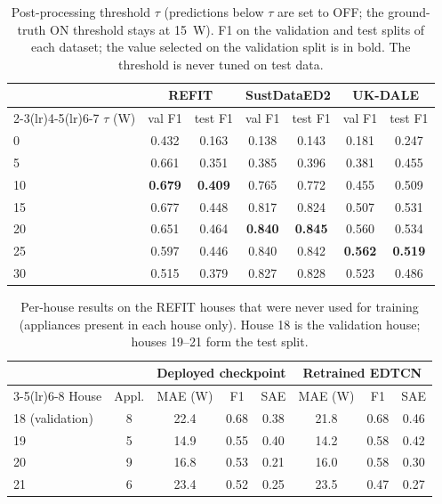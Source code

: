 \begin{table}[H]
\centering
\caption{Post-processing threshold $\tau$ (predictions below $\tau$ are set to OFF; the ground-truth ON threshold stays at 15~W). F1 on the validation and test splits of each dataset; the value selected on the validation split is in bold. The threshold is never tuned on test data.}
\label{tab:threshold_sweep}
\footnotesize
\begin{tabular}{@{}lcccccc@{}}
\toprule
 & \multicolumn{2}{c}{REFIT} & \multicolumn{2}{c}{SustDataED2} & \multicolumn{2}{c}{UK-DALE} \\
\cmidrule(lr){2-3}\cmidrule(lr){4-5}\cmidrule(lr){6-7}
$\tau$ (W) & val F1 & test F1 & val F1 & test F1 & val F1 & test F1 \\
\midrule
0 & 0.432 & 0.163 & 0.138 & 0.143 & 0.181 & 0.247 \\
5 & 0.661 & 0.351 & 0.385 & 0.396 & 0.381 & 0.455 \\
10 & \textbf{0.679} & \textbf{0.409} & 0.765 & 0.772 & 0.455 & 0.509 \\
15 & 0.677 & 0.448 & 0.817 & 0.824 & 0.507 & 0.531 \\
20 & 0.651 & 0.464 & \textbf{0.840} & \textbf{0.845} & 0.560 & 0.534 \\
25 & 0.597 & 0.446 & 0.840 & 0.842 & \textbf{0.562} & \textbf{0.519} \\
30 & 0.515 & 0.379 & 0.827 & 0.828 & 0.523 & 0.486 \\
\bottomrule
\end{tabular}
\end{table}

\begin{table}[H]
\centering
\caption{Per-house results on the REFIT houses that were never used for training (appliances present in each house only). House 18 is the validation house; houses 19--21 form the test split.}
\label{tab:unseen_houses}
\footnotesize
\begin{tabular}{@{}lccccccc@{}}
\toprule
 & & \multicolumn{3}{c}{Deployed checkpoint} & \multicolumn{3}{c}{Retrained EDTCN} \\
\cmidrule(lr){3-5}\cmidrule(lr){6-8}
House & Appl. & MAE (W) & F1 & SAE & MAE (W) & F1 & SAE \\
\midrule
18 (validation) & 8 & 22.4 & 0.68 & 0.38 & 21.8 & 0.68 & 0.46 \\
19 & 5 & 14.9 & 0.55 & 0.40 & 14.2 & 0.58 & 0.42 \\
20 & 9 & 16.8 & 0.53 & 0.21 & 16.0 & 0.58 & 0.30 \\
21 & 6 & 23.4 & 0.52 & 0.25 & 23.5 & 0.47 & 0.27 \\
\bottomrule
\end{tabular}
\end{table}

